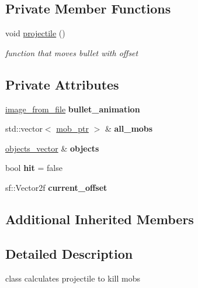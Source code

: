 \subsection*{Private Member Functions}
\begin{DoxyCompactItemize}
\item 
void \hyperlink{classbullet_a1f2cd5b7fa4d4beae1d27c06bc54f8c0}{projectile} ()
\begin{DoxyCompactList}\small\item\em function that moves bullet with offset \end{DoxyCompactList}\end{DoxyCompactItemize}
\subsection*{Private Attributes}
\begin{DoxyCompactItemize}
\item 
\mbox{\label{classbullet_a112af2b0e62f62dbe4d31fdd726c760b}} 
\hyperlink{classimage__from__file}{image\+\_\+from\+\_\+file} {\bfseries bullet\+\_\+animation}
\item 
\mbox{\label{classbullet_a8730572b757fc9d664fb3ce640a797ce}} 
std\+::vector$<$ \hyperlink{typedefs_8hpp_a09ee7f853fc9bc830a9445a06fd53d4b}{mob\+\_\+ptr} $>$ \& {\bfseries all\+\_\+mobs}
\item 
\mbox{\label{classbullet_a93b79bed80ce59b86e3fd332d0c03c5c}} 
\hyperlink{typedefs_8hpp_a6c0fdb1dfd0c34dbbdbb5dcd3c608b07}{objects\+\_\+vector} \& {\bfseries objects}
\item 
\mbox{\label{classbullet_aa8ad03cdacad1e53dedf55b0719b8980}} 
bool {\bfseries hit} = false
\item 
\mbox{\label{classbullet_af59d163e270aa74ebc5fafe6146400bc}} 
sf\+::\+Vector2f {\bfseries current\+\_\+offset}
\end{DoxyCompactItemize}
\subsection*{Additional Inherited Members}


\subsection{Detailed Description}
class calculates projectile to kill mobs 

